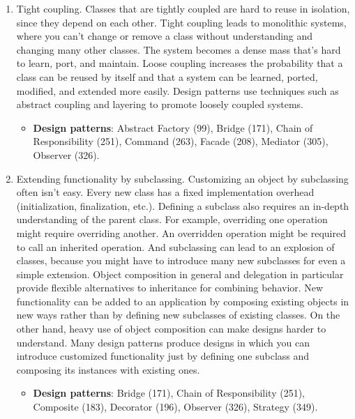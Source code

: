 \documentclass{report}
\begin{document}
\begin{itemize}
\begin{enumerate}
                    \begin{itemize}
                        \item \textbf{Design patterns}: Builder (110), Iterator (289), Strategy (349), Template Method (360), Visitor (366).
                    \end{itemize}
                \item Tight coupling. Classes that are tightly coupled are hard to reuse in isolation, since they depend on each other. Tight coupling leads to monolithic systems, where you can't change or remove a class without understanding and changing many other classes. The system becomes a dense mass that's hard to learn, port, and maintain. Loose coupling increases the probability that a class can be reused by itself and that a system can be learned, ported, modified, and extended more easily. Design patterns use techniques such as abstract coupling and layering to promote loosely coupled systems.
                    \begin{itemize}
                        \item \textbf{Design patterns}: Abstract Factory (99), Bridge (171), Chain of Responsibility (251), Command (263), Facade (208), Mediator (305), Observer (326).
                    \end{itemize}
                \item Extending functionality by subclassing. Customizing an object by subclassing often isn't easy. Every new class has a fixed implementation overhead (initialization, finalization, etc.). Defining a subclass also requires an in-depth understanding of the parent class. For example, overriding one operation might require overriding another. An overridden operation might be required to call an inherited operation. And subclassing can lead to an explosion of classes, because you might have to introduce many new subclasses for even a simple extension. Object composition in general and delegation in particular provide flexible alternatives to inheritance for combining behavior. New functionality can be added to an application by composing existing objects in new ways rather than by defining new subclasses of existing classes. On the other hand, heavy use of object composition can make designs harder to understand. Many design patterns produce designs in which you can introduce customized functionality just by defining one subclass and composing its instances with existing ones.
                    \begin{itemize}
                        \item \textbf{Design patterns}: Bridge (171), Chain of Responsibility (251), Composite (183), Decorator (196), Observer (326), Strategy (349).

\end{itemize}
\end{enumerate}
\end{itemize}
\end{document}
